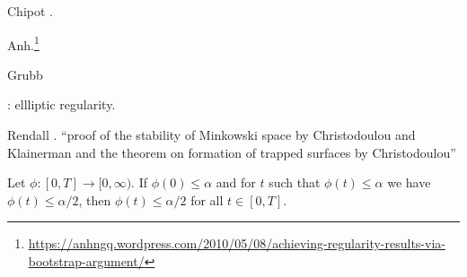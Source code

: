 \documentclass{article}
\begin{document}
Chipot \cite[p.~227, \S 16.4]{chipot}.

Anh.\footnote{\url{https://anhngq.wordpress.com/2010/05/08/achieving-regularity-results-via-bootstrap-argument/}}

Grubb \cite{grubb}

\cite[p.~231]{MR1603811}

\cite{MR3155456}: ellliptic regularity.

Rendall \cite[\S 10.3]{rendall}. ``proof of the stability of Minkowski space by Christodoulou and Klainerman and the theorem on formation of trapped surfaces by Christodoulou''

\cite[p.~475]{princeton}

\cite[p.~11, \S 1.7]{compactness}

Let $\phi:[0,T] \to [0,\infty)$. If $\phi(0) \leq \alpha$ and for $t$ such that $\phi(t) \leq \alpha$ we have $\phi(t) \leq \alpha/2$, then $\phi(t) \leq \alpha/2$ for all $t \in [0,T]$. 

\nocite{*}



\end{document}
